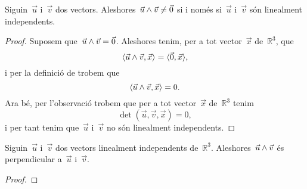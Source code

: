 \documentclass[../../main.tex]{subfiles}
\begin{document}
    \begin{proposition}
        \label{prop:el producte vectorial és zero si i només si els vectors no són linealment independents}
        Siguin~\(\vec{u}\) i~\(\vec{v}\) dos vectors.
        Aleshores~\(\vec{u}\mathbin{\wedge}\vec{v}\neq\vec{0}\) si i només si~\(\vec{u}\) i~\(\vec{v}\) són linealment independents.
        \begin{proof}
            Suposem que~\(\vec{u}\mathbin{\wedge}\vec{v}=\vec{0}\).
            Aleshores tenim, per a tot vector~\(\vec{x}\) de~\(\mathbb{R}^{3}\), que
            \[
                \prodesc{\vec{u}\prodvec\vec{v}}{\vec{x}}=\prodesc{\vec{0}}{\vec{x}},
            \]
            i per la definició de  trobem que
            \[
                \prodesc{\vec{u}\prodvec\vec{v}}{\vec{x}}=0.
            \]
            Ara bé, per l'observació  trobem que per a tot vector~\(\vec{x}\) de~\(\mathbb{R}^{3}\) tenim
            \[
                \det(\vec{u},\vec{v},\vec{x})=0,
            \]
            i per tant tenim que~\(\vec{u}\) i~\(\vec{v}\) no són linealment independents.
        \end{proof}
    \end{proposition}
    \begin{proposition}
        \label{prop:dos vectors linealment independents són perpendiculars al seu producte vectorial}
        \label{prop:el producte vectorial és perpendicular als vectors}
        Siguin~\(\vec{u}\) i~\(\vec{v}\) dos vectors linealment independents de~\(\mathbb{R}^{3}\).
        Aleshores~\(\vec{u}\mathbin{\wedge}\vec{v}\) és perpendicular a~\(\vec{u}\) i~\(\vec{v}\).
        \begin{proof}
        \end{proof}
    \end{proposition}
\end{document}
